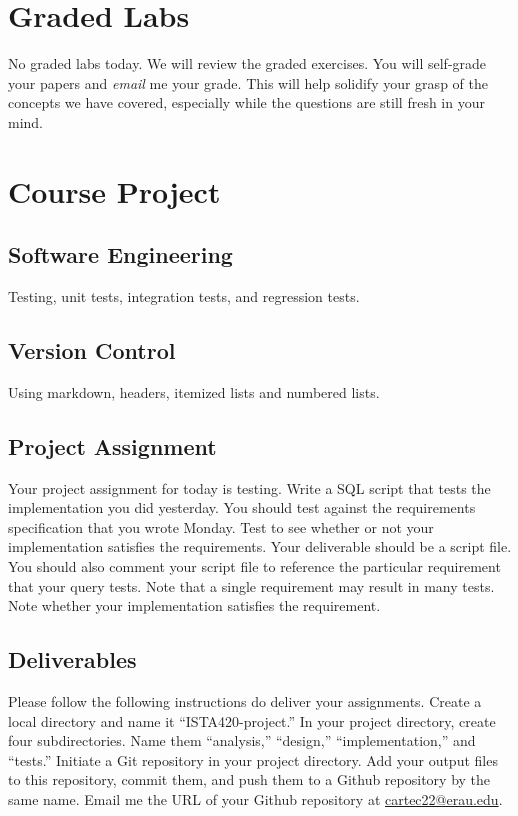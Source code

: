 \documentclass{article}
\begin{document}
    \section{Graded Labs}

    No graded labs today. We will review the graded exercises. You will self-grade your papers and \textit{email} me your grade. This will help solidify your grasp of the concepts we have covered, especially while the questions are still fresh in your mind.  

    \section{Course Project}


        \subsection{Software Engineering}

        Testing, unit tests, integration tests, and regression tests.
        
        \subsection{Version Control}

        Using markdown, headers, itemized lists and numbered lists.

        \subsection{Project Assignment}

        Your project assignment for today is testing. Write a SQL script that tests the implementation you did yesterday. You should test against the requirements specification that you wrote Monday. Test to see whether or not your implementation satisfies the requirements. Your deliverable should be a script file. You should also comment your script file to reference the particular requirement that your query tests. Note that a single requirement may result in many tests. Note whether your implementation satisfies the requirement. 

        \subsection{Deliverables}

        Please follow the following instructions do deliver your assignments. Create a local directory and name it ``ISTA420-project.'' In your project directory, create four subdirectories. Name them ``analysis,'' ``design,'' ``implementation,'' and ``tests.'' Initiate a Git repository in your project directory. Add your output files to this repository, commit them, and push them to a Github repository by the same name. Email me the URL of your Github repository at \url{cartec22@erau.edu}.
\end{document}
